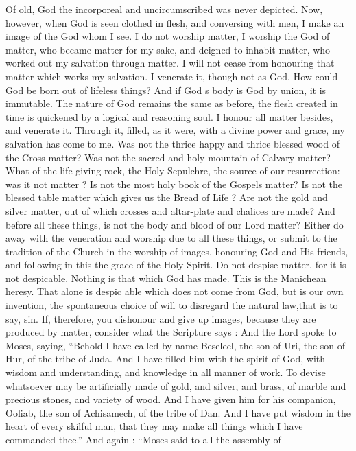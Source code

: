 \documentclass[10pt]{book}
\begin{document}
\begin{paracol}{2}
Of old, God the incorporeal and uncircumscribed was never depicted.
Now, however, when God is seen clothed in flesh,
and conversing with men, I make an image of the 
God whom I see. I do not worship matter, I 
worship the God of matter, who became 
matter for my sake, and deigned to inhabit 
matter, who worked out my salvation through 
matter. I will not cease from honouring that 
matter which works my salvation. I venerate 
it, though not as God. How could God be 
born out of lifeless things? And if God s body 
is God by union, it is immutable. 
The nature of God remains the same as before, 
the flesh created in time is quickened by a 
logical and reasoning soul. I honour all matter 
besides, and venerate it. Through it, filled, as 
it were, with a divine power and grace, my 
salvation has come to me. Was not the thrice 
happy and thrice blessed wood of the Cross 
matter? Was not the sacred and holy mountain 
of Calvary matter? What of the life-giving 
rock, the Holy Sepulchre, the source of our 
resurrection: was it not matter ? Is not the 
most holy book of the Gospels matter? Is not 
the blessed table matter which gives us the 
Bread of Life ? Are not the gold and silver 
matter, out of which crosses and altar-plate and 
chalices are made? And before all these 
things, is not the body and blood of our Lord 
matter? Either do away with the veneration 
and worship due to all these things, or submit 
to the tradition of the Church in the worship of 
images, honouring God and His friends, and 
following in this the grace of the Holy Spirit. 
Do not despise matter, for it is not despicable. 
Nothing is that which God has made. This is 
the Manichean heresy. That alone is despic 
able which does not come from God, but is 
our own invention, the spontaneous choice of 
will to disregard the natural law,\textemdash that is to 
say, sin. If, therefore, you dishonour and give 
up images, because they are produced by 
matter, consider what the Scripture says : And 
the Lord spoke to Moses, saying, ``Behold 
I have called by name Beseleel, the son of Uri, 
the son of Hur, of the tribe of Juda. And I have 
filled him with the spirit of God, with wisdom 
and understanding, and knowledge in all 
manner of work. To devise whatsoever may 
be artificially made of gold, and silver, and 
brass, of marble and precious stones, and 
variety of wood. And I have given him for 
his companion, Ooliab, the son of Achisamech, 
of the tribe of Dan. And I have put wisdom 
in the heart of every skilful man, that they may 
make all things which I have commanded thee.'' 
And again : ``Moses said to all the assembly of 

\end{paracol}
\end{document}

